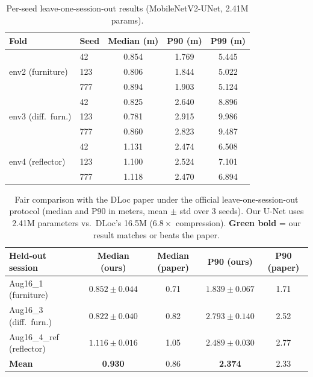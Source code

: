 \documentclass[11pt,a4paper]{article}
\newcommand{\best}[1]{\textcolor{bestcolor}{\textbf{#1}}}
\begin{document}
\begin{table}[H]
\centering
\caption{Per-seed leave-one-session-out results (MobileNetV2-UNet, 2.41M params).}
\label{tab:loso_perseed}
\begin{tabular}{@{}llccc@{}}
\toprule
\textbf{Fold} & \textbf{Seed} & \textbf{Median (m)} & \textbf{P90 (m)} & \textbf{P99 (m)} \\
\midrule
\multirow{3}{*}{env2 (furniture)}   & 42  & 0.854 & 1.769 & 5.445 \\
                                    & 123 & 0.806 & 1.844 & 5.022 \\
                                    & 777 & 0.894 & 1.903 & 5.124 \\
\midrule
\multirow{3}{*}{env3 (diff.\ furn.)}& 42  & 0.825 & 2.640 & 8.896 \\
                                    & 123 & 0.781 & 2.915 & 9.986 \\
                                    & 777 & 0.860 & 2.823 & 9.487 \\
\midrule
\multirow{3}{*}{env4 (reflector)}   & 42  & 1.131 & 2.474 & 6.508 \\
                                    & 123 & 1.100 & 2.524 & 7.101 \\
                                    & 777 & 1.118 & 2.470 & 6.894 \\
\bottomrule
\end{tabular}
\end{table}

\begin{table}[H]
\centering
\caption{Fair comparison with the DLoc paper under the official leave-one-session-out protocol (median and P90 in meters, mean $\pm$ std over 3 seeds). Our U-Net uses 2.41M parameters vs.\ DLoc's 16.5M ($6.8\times$ compression). \best{Green bold} = our result matches or beats the paper.}
\label{tab:paper_comparison}
\begin{tabular}{@{}lcccc@{}}
\toprule
\textbf{Held-out session} & \textbf{Median (ours)} & \textbf{Median (paper)} & \textbf{P90 (ours)} & \textbf{P90 (paper)} \\
\midrule
Aug16\_1 (furniture)     & $0.852 \pm 0.044$ & 0.71 & $1.839 \pm 0.067$ & 1.71 \\
Aug16\_3 (diff.\ furn.)  & \best{$0.822 \pm 0.040$} & 0.82 & $2.793 \pm 0.140$ & 2.52 \\
Aug16\_4\_ref (reflector)& $1.116 \pm 0.016$ & 1.05 & \best{$2.489 \pm 0.030$} & 2.77 \\
\midrule
\textbf{Mean}            & \textbf{0.930} & 0.86 & \textbf{2.374} & 2.33 \\
\bottomrule
\end{tabular}
\end{table}
\end{document}
